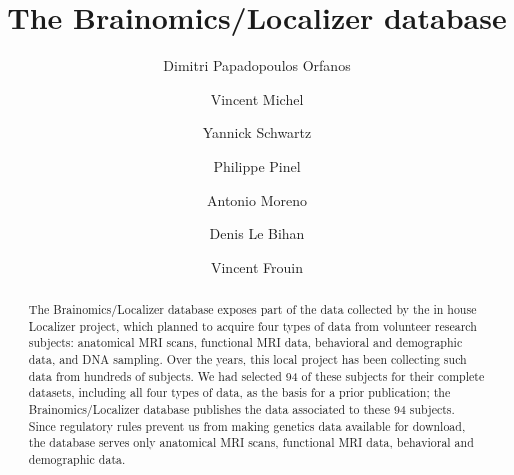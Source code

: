 \documentclass[preprint,12pt]{elsarticle}
\begin{document}
\begin{frontmatter}


\title{The Brainomics/Localizer database}




\author[Neurospin]{Dimitri Papadopoulos Orfanos}
\author[Logilab]{Vincent Michel}
\author[Parietal,Neurospin]{Yannick Schwartz}
\author[U992,Neurospin,ParisSud]{Philippe Pinel}
\author[U992,Neurospin,ParisSud]{Antonio Moreno}
\author[Neurospin]{Denis Le Bihan}
\author[Neurospin]{Vincent Frouin}

\address[Neurospin]{CEA, DSV/I2BM, NeuroSpin, 91191 Gif-sur-Yvette, France}
\address[U992]{INSERM, U992, Cognitive Neuroimaging Unit, 91191 Gif-sur-Yvette, France}
\address[Parietal]{Parietal team, Inria Saclay \^Ile-de-France, 91120 Palaiseau, France}
\address[ParisSud]{Univ. Paris-Sud, Cognitive Neuroimaging Unit, 91191 Gif-sur-Yvette, France}
\address[Logilab]{Logilab, 104 boulevard Auguste Blanqui, 75013 Paris, France}

\begin{abstract}
The Brainomics/Localizer database exposes part of the data collected by the in house Localizer project, which planned to acquire four types of data from volunteer research subjects: anatomical MRI scans, functional MRI data, behavioral and demographic data, and DNA sampling. Over the years, this local project has been collecting such data from hundreds of subjects. We had selected 94 of these subjects for their complete datasets, including all four types of data, as the basis for a prior publication; the Brainomics/Localizer database publishes the data associated to these 94 subjects. Since regulatory rules prevent us from making genetics data available for download, the database serves only anatomical MRI scans, functional MRI data, behavioral and demographic data.


\end{abstract}
\end{frontmatter}
\end{document}
